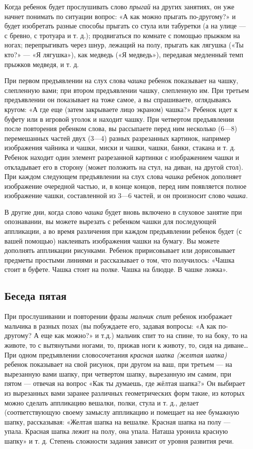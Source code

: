 \documentclass[a5paper]{book}
\renewcommand{\emph}[1]{\textit{#1}}
\begin{document}
Когда ребенок будет прослушивать слово \emph{прыгай} на других занятиях,
он уже начнет понимать по ситуации вопрос: «А как можно прыгать
по-другому?» и будет изобретать разные способы прыгать со стула или
табуретки (а на улице --- с бревно, с тротуара и т. д.); продвигаться по
комнате с помощью прыжком на ногах; перепрыгивать через шнур, лежащий на
полу, прыгать как лягушка («Ты кто?» --- «Я лягушка»), как медведь («Я
медведь»), передавая медленный темп прыжков медведя, и т. д.

При первом предъявлении на слух слова \emph{чашка} ребенок показывает на
чашку, слепленную вами; при втором предъявлении чашку, слепленную им.
При третьем предъявлении он показывает на тоже самое, а вы спрашиваете,
оглядываясь кругом: «А где еще (затем закрываете лицо экраном) чашка?»
Ребенок идет к буфету или в игровой уголок и находит чашку. При
четвертом предъявлении после повторения ребенком слова, вы рассыпаете
перед ним несколько (6---8) перемешанных частей двух (3---4) разных
разрезанных картинок, например изображения чайника и чашки, миски и
чашки, чашки, банки, стакана и т. д. Ребенок находит один элемент
разрезанной картинки с изображением чашки и откладывает его в сторону
(может положить на стул, на диван, на другой стол). При каждом следующем
предъявлении на слух слова \emph{чашка} ребенок дополняет изображение
очередной частью, и, в конце концов, перед ним появляется полное
изображение чашки, составленной из 3---6 частей, и он произносит слово
\emph{чашка.}

В другие дни, когда слово \emph{чашка} будет вновь включено в слуховое
занятие при опознавании, вы можете вырезать с ребенком чашки для
последующей аппликации, а во время различения при каждом предъявлении
ребенок будет (с вашей помощью) наклеивать изображения чашки на бумагу.
Вы можете дополнять аппликации рисунками. Ребенок пририсовывает или
дорисовывает предметы простыми линиями и рассказывает о том, что
получилось: «Чашка стоит в буфете. Чашка стоит на полке. Чашка на
блюдце. В чашке ложка».

\subsection*{Беседа пятая}

При прослушивании и повторении фразы \emph{мальчик спит} ребенок
изображает мальчика в разных позах (вы побуждаете его, задавая вопросы:
«А как по-другому? А еще как можно?» и т.д.) мальчик спит то на спине,
то на боку, то на животе, то с вытянутыми ногами, то, прижав ноги к
животу, то, сидя на диване\ldots{} При одном предъявлении словосочетания
\emph{красная шапка (желтая шапка)} ребенок показывает на свой рисунок,
при другом на ваш, при третьем --- на вырезанную вами шапку, при
четвертом шапку, вырезанную им самим, при пятом --- отвечая на вопрос
«Как ты думаешь, где жёлтая шапка?» Он выбирает из вырезанных вами
заранее различных геометрических форм такие, из которых можно сделать
аппликацию вешалки, полки, стула и т. д., делает (соответствующую своему
замыслу аппликацию и помещает на нее бумажную шапку, рассказывая:
«Желтая шапка на вешалке. Красная шапка на полу --- упала. Красная шапка
лежит на полу, она упала. Наташа уронила красную шапку» и т. д. Степень
сложности задания зависит от уровня развития речи.
\end{document}
